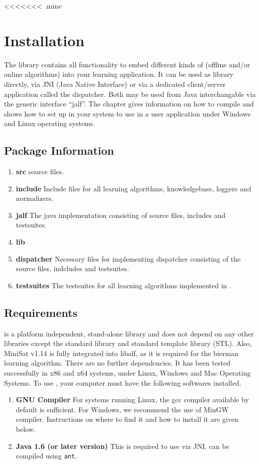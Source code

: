 <<<<<<< .mine

\chapter{Installation}
The \libalf library contains all functionality to embed different kinds of (offline and/or online algorithms) into your learning application. It can be used as \cpp library directly, via JNI (Java Native Interface) or via a dedicated client/server application called the dispatcher. Both may be used from Java interchangable via the generic interface ``jalf''.
The chapter gives information on how to compile \libalf and shows how to set up \libalf in your system to use in a user application under Windows and Linux operating systems.

\section{Package Information}
\begin{enumerate}
 \item \textbf{src}
	\libalf source files. 
 \item \textbf{include}
	Include files for all learning algorithms, knowledgebase, loggers and normalizers.
 \item \textbf{jalf}
	The java implementation consisting of source files, includes and testsuites. 
 \item \textbf{lib}
 	
 \item \textbf{dispatcher}
 	Necessary files for implementing dispatcher consisting of the source files, indcludes and testsuites.
 \item \textbf{testsuites}
        The testsuites for all learning algorithms implemented in \libalf.
\end{enumerate}

\section{Requirements}
\libalf is a platform independent, stand-alone \cpp library and does not depend on any other libraries except the \cpp standard library and standard template library (STL). Also, MiniSat v1.14 is fully integrated into libalf, as it is required for the bierman learning algorithm. There are no further dependencies. It has been tested successfully in x86 and x64 systems, under Linux, Windows and Mac Operating Systems. To use \libalf, your computer must have the following softwares installed.
\begin{enumerate}
 \item \textbf{GNU Compiler} \vskip 1pt
	For systems running Linux, the gcc compiler available by default is sufficient. \vskip 1pt
	For Windows, we recommend the use of MinGW compiler. Instructions on where to find it and how to install it are given below.
 \item \textbf{Java 1.6 (or later version)} \vskip 1pt
	This is required to use \libalf via JNI. \jalf can be compiled using \texttt{ant}.
\end{enumerate}

